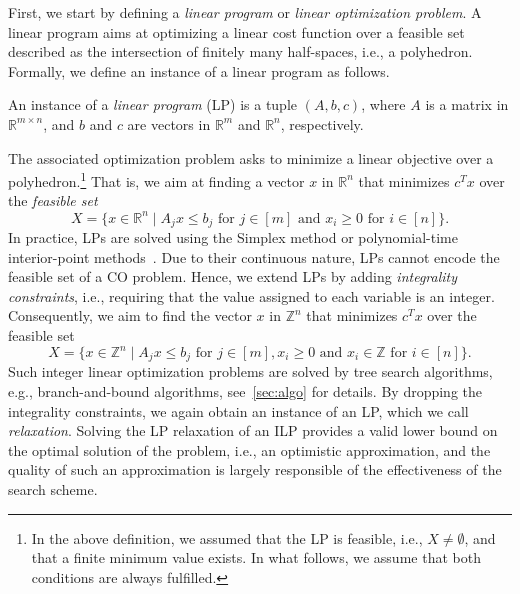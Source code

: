 \documentclass[twoside,11pt]{article}
\newcommand{\new}[1]{\emph{#1}}
\newcommand{\bbR}{\ensuremath{\mathbb{R}}}
\newcommand{\bbZ}{\ensuremath{\mathbb{Z}}}
\begin{document}
First, we start by defining a \emph{linear program} or \emph{linear optimization problem}. A linear program aims at optimizing a linear cost function over a feasible set described as the intersection of finitely many half-spaces, i.e., a polyhedron. Formally, we define an instance of a linear program as follows.
\begin{definition}
	An instance of a \emph{linear program} (LP) is a tuple $(A,b,c)$, where $A$ is a matrix in $\bbR^{m \times n}$, and $b$ and $c$ are vectors in $\bbR^{m}$ and $\bbR^{n}$, respectively. %
\end{definition}
The associated optimization problem asks to minimize a linear objective over a polyhedron.\footnote{In the above definition, we assumed that the LP is feasible, i.e., $X \neq \emptyset$, and that a finite minimum value exists. In what
	follows, we assume that both conditions are always fulfilled.}
That is, we aim at finding a vector $x$ in $\bbR^{n}$ that minimizes $c^T x$ over the \emph{feasible set} %
\begin{equation*}
	X = \{ x \in \bbR^n \mid A_j x \leq b_j \text{ for } j \in [m]  \text{ and }  x_i \geq 0 \text{ for } i \in [n]  \}.
\end{equation*} %
In practice, LPs are solved using the Simplex method or polynomial-time interior-point methods~\citep{Ber+2007}. Due to their continuous nature, LPs cannot encode the feasible set of a CO problem. Hence, we extend LPs by adding \new{integrality constraints}, i.e., requiring that the value assigned to each variable is an integer. Consequently, we aim to find the vector $x$ in $\bbZ^{n}$ that minimizes $c^T x$ over the feasible set
\begin{equation*}
	X = \{ x \in \bbZ^n \mid A_j x \leq b_j  \text{ for } j \in [m] ,  x_i \geq 0 \text{ and } x_i \in \mathbb{Z} \text{ for } i \in [n]  \}.
\end{equation*}
Such integer linear optimization problems are solved by tree search algorithms, e.g., branch-and-bound algorithms, see~\cref{sec:algo} for details. By dropping the integrality constraints, we again obtain an instance of an LP, which we call \emph{relaxation}. Solving the LP relaxation of an ILP provides a valid lower bound on the optimal solution of the problem, i.e., an optimistic approximation, and the quality of such an approximation is largely responsible of the effectiveness of the search scheme.
\end{document}
